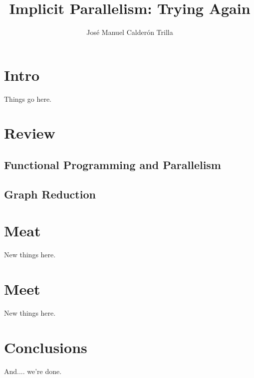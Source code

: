 \documentclass{tufte-book}
\title{Implicit Parallelism: Trying Again}
\author{Jos\'{e} Manuel Calder\'{o}n Trilla}
\newcommand{\blankpage}{\newpage\hbox{}\thispagestyle{empty}\newpage}
\begin{document}
\frontmatter

\blankpage

\maketitle

\tableofcontents
\listoffigures
\listoftables

\chapter{Intro}

    Things go here.

\chapter{Review}

    \section{Functional Programming and Parallelism}
    
    
    \section{Graph Reduction}
    

\chapter{Meat}

    New things here.
    
\chapter{Meet}

    New things here.

\chapter{Conclusions}

    And.... we're done.

\backmatter



\end{document}
